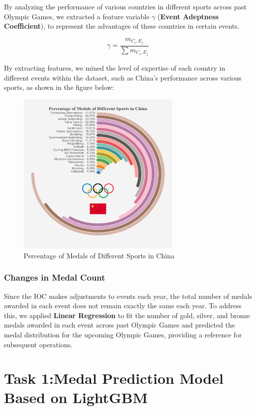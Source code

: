 \documentclass[12pt]{article}  %
\begin{document}
By analyzing the performance of various countries in different sports across past Olympic Games, we extracted a feature variable $\gamma$ (\textbf{Event Adeptness Coefficient}), to represent the advantages of these countries in certain events.

\begin{equation}
	\gamma = \frac{m_{C_i,E_j}}{\sum m_{C_i,E_j}}
\end{equation}





By extracting features, we mined the level of expertise of each country in different events within the dataset, such as China's performance across various sports, as shown in the figure below:

\begin{figure}[H]
	\centering
	\includegraphics[width=8cm]{img/Percentage.jpg}
	\caption{Percentage of Medals of Different Sports in China}
	\label{fig:aa}
\end{figure}


\subsubsection{Changes in Medal Count}
Since the IOC makes adjustments to events each year, the total number of medals awarded in each event does not remain exactly the same each year. To address this, we applied\textbf{ Linear Regression} to fit the number of gold, silver, and bronze medals awarded in each event across past Olympic Games and predicted the medal distribution for the upcoming Olympic Games, providing a reference for subsequent operations.

\section{Task 1:Medal Prediction Model Based on LightGBM}
\end{document}
